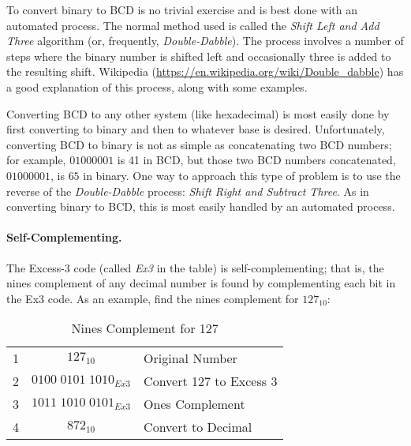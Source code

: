
To convert binary to \ac{BCD} is no trivial exercise and is best done with an automated process. The normal method used is called the \emph{Shift Left and Add Three} algorithm (or, frequently, \emph{Double-Dabble}). The process involves a number of steps where the binary number is shifted left and occasionally three is added to the resulting shift. Wikipedia (\url{https://en.wikipedia.org/wiki/Double_dabble}) has a good explanation of this process, along with some examples.

Converting \ac{BCD} to any other system (like hexadecimal) is most easily done by first converting to binary and then to whatever base is desired. Unfortunately, converting \ac{BCD} to binary is not as simple as concatenating two \ac{BCD} numbers; for example, $ 0100 0001 $ is 41 in \ac{BCD}, but those two \ac{BCD} numbers concatenated, $ 01000001 $, is $ 65 $ in binary. One way to approach this type of problem is to use the reverse of the \emph{Double-Dabble} process: \emph{Shift Right and Subtract Three}. As in converting binary to \ac{BCD}, this is most easily handled by an automated process.

\paragraph{Self-Complementing.} The Excess-3 code (called \emph{Ex3} in the table) is self-complementing; that is, the nines complement of any decimal number is found by complementing each bit in the Ex3 code. As an example, find the nines complement for $ 127_{10} $:

\begin{table}[H]
  \sffamily
  \newcommand{\head}[1]{\textcolor{white}{\textbf{#1}}}    
  \begin{center}
    \begin{tabular}{ c | c l } 
      \hline
      1 & $ 127_{10} $ & {Original Number} \\
      2 & $ 0100 \; 0101 \; 1010_{Ex3} $ & {Convert 127 to Excess 3} \\
      3 & $ 1011 \; 1010 \; 0101_{Ex3} $ & {Ones Complement} \\
      4 & $ 872_{10} $ & {Convert to Decimal} \\
      \hline  
    \end{tabular}
  \end{center}
  \caption{Nines Complement for 127}
  \label{MO:tab:nines_complement}
\end{table}

